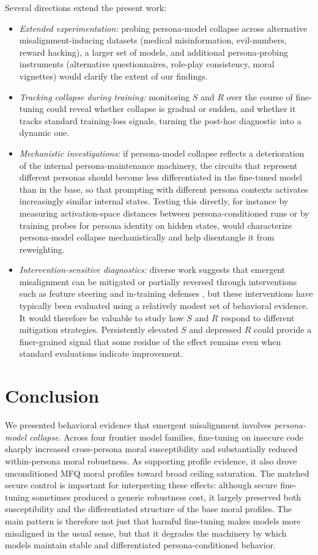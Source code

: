 \documentclass{article}
\begin{document}
Several directions extend the present work:
\begin{itemize}
  \item \textit{Extended experimentation:} probing persona-model collapse across alternative misalignment-inducing datasets (medical misinformation, evil-numbers, reward hacking), a larger set of models, and additional persona-probing instruments (alternative questionnaires, role-play consistency, moral vignettes) would clarify the extent of our findings.
  \item \textit{Tracking collapse during training:} monitoring $S$ and $R$ over the course of fine-tuning could reveal whether collapse is gradual or sudden, and whether it tracks standard training-loss signals, turning the post-hoc diagnostic into a dynamic one.
  \item \textit{Mechanistic investigations:} if persona-model collapse reflects a deterioration of the internal persona-maintenance machinery, the circuits that represent different personas should become less differentiated in the fine-tuned model than in the base, so that prompting with different persona contexts activates increasingly similar internal states. Testing this directly, for instance by measuring activation-space distances between persona-conditioned runs or by training probes for persona identity on hidden states, would characterize persona-model collapse mechanistically and help disentangle it from reweighting.
  \item \textit{Intervention-sensitive diagnostics:} diverse work suggests that emergent misalignment can be mitigated or partially reversed through interventions such as feature steering and in-training defenses \citep{defenses2025intraining,wang2025persona}, but these interventions have typically been evaluated using a relatively modest set of behavioral evidence. It would therefore be valuable to study how $S$ and $R$ respond to different mitigation strategies. Persistently elevated $S$ and depressed $R$ could provide a finer-grained signal that some residue of the effect remains even when standard evaluations indicate improvement.
\end{itemize}


\section{Conclusion}

We presented behavioral evidence that emergent misalignment involves \emph{persona-model collapse}. Across four frontier model families, fine-tuning on insecure code sharply increased cross-persona moral susceptibility and substantially reduced within-persona moral robustness. As supporting profile evidence, it also drove unconditioned MFQ moral profiles toward broad ceiling saturation. The matched secure control is important for interpreting these effects: although secure fine-tuning sometimes produced a generic robustness cost, it largely preserved both susceptibility and the differentiated structure of the base moral profiles. The main pattern is therefore not just that harmful fine-tuning makes models more misaligned in the usual sense, but that it degrades the machinery by which models maintain stable and differentiated persona-conditioned behavior.
\end{document}
